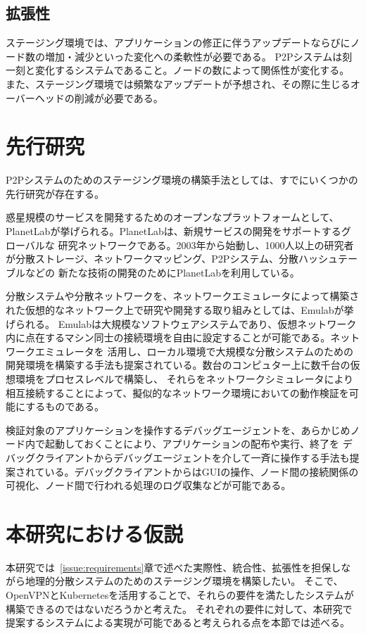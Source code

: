 \subsection{拡張性}
\label{issue:requirements3}
ステージング環境では、アプリケーションの修正に伴うアップデートならびにノード数の増加・減少といった変化への柔軟性が必要である。
P2Pシステムは刻一刻と変化するシステムであること。ノードの数によって関係性が変化する。
また、ステージング環境では頻繁なアップデートが予想され、その際に生じるオーバーヘッドの削減が必要である。

\section{先行研究}
\label{issue:previous-research}
P2Pシステムのためのステージング環境の構築手法としては、すでにいくつかの先行研究が存在する。

惑星規模のサービスを開発するためのオープンなプラットフォームとして、PlanetLabが挙げられる。PlanetLabは、新規サービスの開発をサポートするグローバルな
研究ネットワークである。2003年から始動し、1000人以上の研究者が分散ストレージ、ネットワークマッピング、P2Pシステム、分散ハッシュテーブルなどの
新たな技術の開発のためにPlanetLabを利用している。

分散システムや分散ネットワークを、ネットワークエミュレータによって構築された仮想的なネットワーク上で研究や開発する取り組みとしては、Emulabが挙げられる。
Emulabは大規模なソフトウェアシステムであり、仮想ネットワーク内に点在するマシン同士の接続環境を自由に設定することが可能である。ネットワークエミュレータを
活用し、ローカル環境で大規模な分散システムのための開発環境を構築する手法も提案されている。数台のコンピュター上に数千台の仮想環境をプロセスレベルで構築し、
それらをネットワークシミュレータにより相互接続することによって、擬似的なネットワーク環境においての動作検証を可能にするものである。

検証対象のアプリケーションを操作するデバッグエージェントを、あらかじめノード内で起動しておくことにより、アプリケーションの配布や実行、終了を
デバッグクライアントからデバッグエージェントを介して一斉に操作する手法も提案されている。デバッグクライアントからはGUIの操作、ノード間の接続関係の
可視化、ノード間で行われる処理のログ収集などが可能である。


\section{本研究における仮説}
\label{issue:hypothesis}
本研究では~\ref{issue:requirements}章で述べた実際性、統合性、拡張性を担保しながら地理的分散システムのためのステージング環境を構築したい。
そこで、OpenVPNとKubernetesを活用することで、それらの要件を満たしたシステムが構築できるのではないだろうかと考えた。
それぞれの要件に対して、本研究で提案するシステムによる実現が可能であると考えられる点を本節では述べる。

